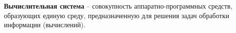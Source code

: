 
\noindent
\textbf{Вычислительная система} -- совокупность аппаратно-программных средств, образующих единую среду, предназначенную для решения задач обработки информации (вычислений).\\\\